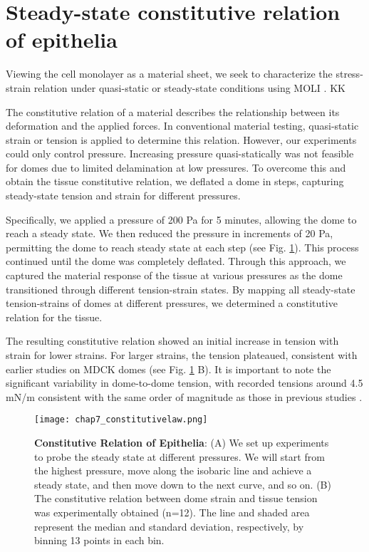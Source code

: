 \hypertarget{constitutive-relation-of-epithelia}{%
	\section{Steady-state constitutive relation of
		epithelia}\label{constitutive-relation-of-epithelia}}

Viewing the cell monolayer as a material sheet, we seek to characterize the stress-strain relation  under quasi-static or steady-state conditions using MOLI \cite{latorre2018,duque2023}. KK

The constitutive relation of a material describes the relationship between its deformation and the applied forces. In conventional material testing, quasi-static strain or tension is applied to determine this relation. However, our experiments could only control pressure. Increasing pressure quasi-statically was not feasible for domes due to limited delamination at low pressures. To overcome this and obtain the tissue constitutive relation, we deflated a dome in steps, capturing steady-state tension and strain for different pressures.

Specifically, we applied a pressure of 200 \unit{\pascal} for 5 minutes, allowing the dome to reach a steady state. We then reduced the pressure in increments of 20 \unit{\pascal}, permitting the dome to reach steady state at each step (see Fig. \ref{fig_7_5}). This process continued until the dome was completely deflated. Through this approach, we captured the material response of the tissue at various pressures as the dome transitioned through different tension-strain states. By mapping all steady-state tension-strains of domes at different pressures, we determined a constitutive relation for the tissue.

The resulting constitutive relation showed an initial increase in tension with strain for lower strains. For larger strains, the tension plateaued, consistent with earlier studies on MDCK domes (see Fig. \ref{fig_7_5} B). It is important to note the significant variability in dome-to-dome tension, with recorded tensions around 4.5 \unit{mN/m} consistent with the same order of magnitude as those in previous studies \cite{latorre2018,marin-llaurado2022}.

\begin{figure}[b!]
	\centering
	\texttt{[image: chap7\_constitutivelaw.png]}
	\caption{\label{fig_7_5} \textbf{Constitutive Relation of Epithelia}: (A) We set up experiments to probe the steady state at different pressures. We will start from the highest pressure, move along the isobaric line and achieve a steady state, and then move down to the next curve, and so on.	(B) The constitutive relation between dome strain and tissue tension was experimentally obtained (n=12). The line and shaded area represent the median and standard deviation, respectively, by binning 13 points in each bin.}
\end{figure}

